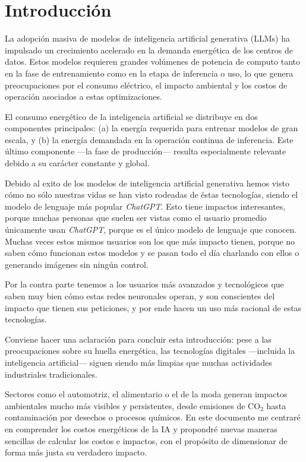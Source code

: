 \section{Introducción}

La adopción masiva de modelos de inteligencia artificial generativa (LLMs) ha impulsado un crecimiento acelerado en la demanda energética de los centros de datos. Estos modelos requieren grandes volúmenes de potencia de computo tanto en la fase de entrenamiento como en la etapa de inferencia o uso, lo que genera preocupaciones por el consumo eléctrico, el impacto ambiental y los costos de operación asociados a estas optimizaciones.

El consumo energético de la inteligencia artificial se distribuye en dos componentes principales: (a) la energía requerida para entrenar modelos de gran escala, y (b) la energía demandada en la operación continua de inferencia. Este último componente —la fase de producción— resulta especialmente relevante debido a su carácter constante y global.

Debido al exito de los modelos de inteligencia artificial generativa hemos visto cómo no sólo nuestras vidas se han visto rodeadas de éstas tecnologías, siendo el modelo de lenguaje más popular \textit{ChatGPT}.
Esto tiene impactos interesantes, porque muchas personas que suelen ser vistas como el usuario promedio únicamente usan \textit{ChatGPT}, porque es el único modelo de lenguaje que conocen. Muchas veces estos mismos usuarios son los que más impacto tienen, porque no saben cómo funcionan estos modelos y se pasan todo el día charlando con ellos o generando imágenes sin ningún control. 

Por la contra parte tenemos a los usuarios más avanzados y tecnológicos que saben muy bien cómo estas redes neuronales operan, y son conscientes del impacto que tienen sus peticiones, y por ende hacen un uso más racional de estas tecnologías.

Conviene hacer una aclaración para concluir esta introducción: pese a las preocupaciones sobre su huella energética, las tecnologías digitales —incluida la inteligencia artificial— siguen siendo más limpias que muchas actividades industriales tradicionales.

Sectores como el automotriz, el alimentario o el de la moda generan impactos ambientales mucho más visibles y persistentes, desde emisiones de CO$_2$ hasta contaminación por desechos o procesos químicos. En este documento me centraré en comprender los costos energéticos de la IA y propondré nuevas maneras sencillas de calcular los costos e impactos, con el propósito de dimensionar de forma más justa su verdadero impacto.
